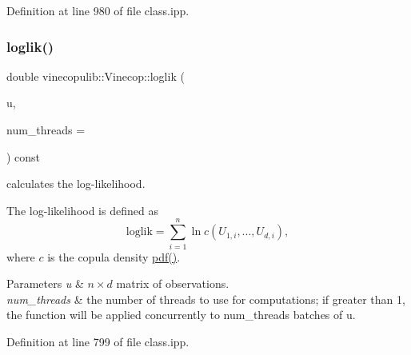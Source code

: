 Definition at line 980 of file class.\+ipp.

\mbox{\label{classvinecopulib_1_1_vinecop_a07e9c59b42d0668df5fc5e69b281272e}} 
\subsubsection{\texorpdfstring{loglik()}{loglik()}}
{\footnotesize\ttfamily double vinecopulib\+::\+Vinecop\+::loglik (\begin{DoxyParamCaption}\item[{const Eigen\+::\+Matrix\+Xd \&}]{u,  }\item[{const size\+\_\+t}]{num\+\_\+threads = {} }\end{DoxyParamCaption}) const\hspace{0.3cm}{\ttfamily [inline]}}



calculates the log-\/likelihood. 

The log-\/likelihood is defined as \[ \mathrm{loglik} = \sum_{i = 1}^n \ln c(U_{1, i}, ..., U_{d, i}), \] where $ c $ is the copula density \hyperlink{classvinecopulib_1_1_vinecop_ad4ba574fee5f39170e1a38b921a4c02f}{pdf()}.


\begin{DoxyParams}{Parameters}
{\em u} & $n \times d$ matrix of observations. \\
\hline
{\em num\+\_\+threads} & the number of threads to use for computations; if greater than 1, the function will be applied concurrently to {\ttfamily num\+\_\+threads} batches of {\ttfamily u}. \\
\hline
\end{DoxyParams}


Definition at line 799 of file class.\+ipp.

\mbox{\label{classvinecopulib_1_1_vinecop_ac99ec5154d923ee5eb73fdad071bca46}} 
